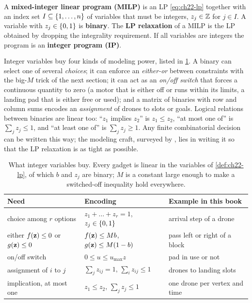 \begin{definition}
\label{def:ch22-milp}
A \textbf{mixed-integer linear program (MILP)} is an LP \cref{eq:ch22-lp} together with an index set
$I \subseteq \left\{ 1,\dots,n \right\}$ of variables that must be integers,
$z_j \in \mathbb{Z}$ for $j \in I$. A variable with $z_j \in \left\{ 0,1 \right\}$ is
\textbf{binary}. The \textbf{LP relaxation} of a
MILP is the LP obtained by dropping the integrality requirement. If all
variables are integers the program is an \textbf{integer program
(IP)}.
\end{definition}

Integer variables buy four kinds of modeling power, listed in
\cref{tab:ch22-gadgets}. A binary can select one of several
\emph{choices}; it can enforce an \emph{either-or} between constraints with
the big-$M$ trick of the next section; it can act as an \emph{on/off switch}
that forces a continuous quantity to zero (a motor that is either off or runs
within its limits, a landing pad that is either free or used); and a matrix
of binaries with row and column sums encodes an \emph{assignment} of drones
to slots or goals. Logical relations between binaries are linear too:
``$z_1$ implies $z_2$'' is $z_1 \le z_2$, ``at most one of'' is
$\sum_j z_j \le 1$, and ``at least one of'' is $\sum_j z_j \ge 1$. Any
finite combinatorial decision can be written this way; the modeling craft,
surveyed by \textcite{vielma2015mixed}, lies in writing it so that the LP
relaxation is as tight as possible.

\begin{table}[tb]
  \centering\small
  \caption{What integer variables buy. Every gadget is linear in the
  variables of \cref{def:ch22-lp}, of which $b$ and $z_j$ are binary; $M$ is
  a constant large enough to make a switched-off inequality hold everywhere.}
  \label{tab:ch22-gadgets}
  \begin{tabular}{@{}lll@{}}
  \toprule
  Need & Encoding & Example in this book\\
  \midrule
  choice among $r$ options & $z_1 + \dots + z_r = 1$, $z_j \in \left\{ 0,1 \right\}$ & arrival step of a drone\\
  either $f(\mathbf{z}) \le 0$ or $g(\mathbf{z}) \le 0$ & $f(\mathbf{z}) \le M b$, $g(\mathbf{z}) \le M(1-b)$ & pass left or right of a block\\
  on/off switch & $0 \le u \le u_{\max} z$ & pad in use or not\\
  assignment of $i$ to $j$ & $\sum_j z_{ij} = 1$, $\sum_i z_{ij} \le 1$ & drones to landing slots\\
  implication, at most one & $z_1 \le z_2$, \; $\sum_j z_j \le 1$ & one drone per vertex and time\\
  \bottomrule
  \end{tabular}
\end{table}


